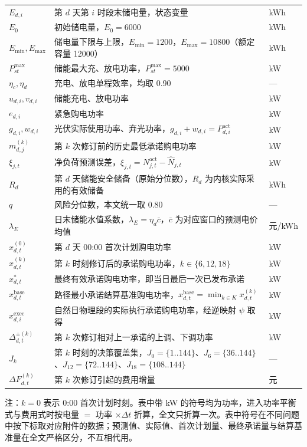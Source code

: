 \documentclass[12pt,a4paper]{ctexart}
\begin{document}
\begin{longtable}{C{0.24\textwidth}C{0.38\textwidth}C{0.38\textwidth}}
$E_{d,i}$ & 第 $d$ 天第 $i$ 时段末储电量，状态变量 & kWh \\
$E_0$ & 初始储电量，$E_0=6000$ & kWh \\
$E_{\min},E_{\max}$ & 储电量下限与上限，$E_{\min}=1200$，$E_{\max}=10800$（额定容量 12000） & kWh \\
$P_{st}^{\max}$ & 储能最大充、放电功率，$P_{st}^{\max}=5000$ & kW \\
$\eta_c,\eta_d$ & 充电、放电单程效率，均取 0.90 & — \\
$u_{d,i},v_{d,i}$ & 储能充电、放电功率 & kW \\
$e_{d,i}$ & 紧急购电功率 & kW \\
$g_{d,i},w_{d,i}$ & 光伏实际使用功率、弃光功率，$g_{d,i}+w_{d,i}=P_{d,i}^{\mathrm{act}}$ & kW \\
$m_{d,j}^{(k)}$ & 第 $k$ 次修订前的历史最低承诺购电功率 & kW \\
$\xi_{j,t}$ & 净负荷预测误差，$\xi_{j,t}=N_{j,t}^{\mathrm{act}}-\widehat{N}_{j,t}$ & kW \\
$R_d$ & 第 $d$ 天储能安全储备（原始分位数），$\widehat{R}_d$ 为内核实际采用的有效储备 & kWh \\
$q$ & 风险分位数，本文统一取 0.80 & — \\
$\lambda_E$ & 日末储能水值系数，$\lambda_E=\eta_d\bar{c}$，$\bar{c}$ 为对应窗口的预测电价均值 & 元/kWh \\
$x_{d,t}^{(0)}$ & 第 $d$ 天 00:00 首次计划购电功率 & kW \\
$x_{d,t}^{(k)}$ & 第 $k$ 时刻修订后的承诺购电功率，$k\in\{6,12,18\}$ & kW \\
$x_{d,t}^{*}$ & 最终有效承诺购电功率，即当日最后一次已发布承诺 & kW \\
$x_{d,t}^{\mathrm{base}}$ & 路径最小承诺结算基准购电功率，$x_{d,t}^{\mathrm{base}}=\min_{k\in K}x_{d,t}^{(k)}$ & kW \\
$x_{d,i}^{\mathrm{exec}}$ & 自然日物理段的实际执行承诺购电功率，经逆映射 $\psi$ 取得 & kW \\
$\Delta_{d,t}^{\pm(k)}$ & 第 $k$ 次修订相对上一承诺的上调、下调功率 & kW \\
$J_k$ & 第 $k$ 时刻的决策覆盖集，$J_0=\{1..144\}$、$J_6=\{36..144\}$、$J_{12}=\{72..144\}$、$J_{18}=\{108..144\}$ & — \\
$\Delta F_{d,t}^{(k)}$ & 第 $k$ 次修订引起的费用增量 & 元 \\
\bottomrule
\end{longtable}
\par\vspace{2pt}\footnotesize 注：$k=0$ 表示 0:00 首次计划时刻。表中带 kW 的符号均为功率，进入功率平衡式与费用式时按电量 $=$ 功率 $\times\Delta t$ 折算，全文只折算一次。表中符号在不同问题中按下标取对应附件的数据；预测值、实际值、首次计划量、最终承诺量与结算基准量在全文严格区分，不互相代用。
\end{document}
